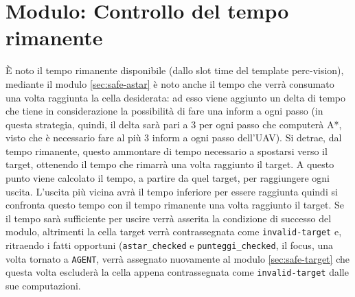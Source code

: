 \section{Modulo: Controllo del tempo rimanente} \label{sec:safe-tempo}
È noto il tempo rimanente disponibile (dallo slot time del template perc-vision), mediante il modulo \ref{sec:safe-astar} è noto anche il tempo che verrà consumato una volta raggiunta la cella desiderata: ad esso viene aggiunto un delta di tempo che tiene in considerazione la possibilità di fare una inform a ogni passo (in questa strategia, quindi, il delta sarà pari a 3 per ogni passo che computerà A*, visto che è necessario fare al più 3 inform a ogni passo dell'UAV). Si detrae, dal tempo rimanente, questo ammontare di tempo necessario a spostarsi verso il target, ottenendo il tempo che rimarrà una volta raggiunto il target. A questo punto viene calcolato il tempo, a partire da quel target, per raggiungere ogni uscita. L'uscita più vicina avrà il tempo inferiore per essere raggiunta quindi si confronta questo tempo con il tempo rimanente una volta raggiunto il target. Se il tempo sarà sufficiente per uscire verrà asserita la condizione di successo del modulo, altrimenti la cella target verrà contrassegnata come \texttt{invalid-target} e, ritraendo i fatti opportuni (\texttt{astar\_checked} e \texttt{punteggi\_checked}, il focus, una volta tornato a \texttt{AGENT}, verrà assegnato nuovamente al modulo \ref{sec:safe-target} che questa volta escluderà la cella appena contrassegnata come \texttt{invalid-target} dalle sue computazioni.

